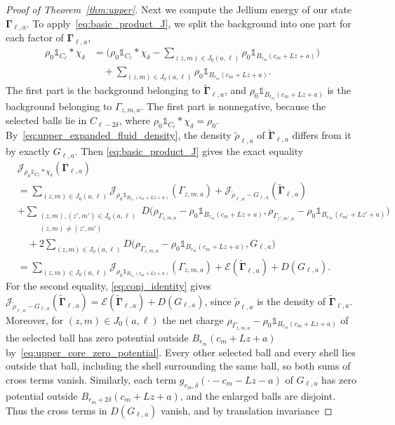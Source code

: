 \documentclass[final,reqno]{amsart}
\theoremstyle{remark}
\theoremstyle{definition}
\newcommand{\iden}{\mathbb{1}}
\newcommand{\EC}{\mathcal{E}}
\newcommand{\vGamma}{{\bm{\Gamma}}}
\begin{document}
\begin{proof}[Proof of Theorem~\ref{thm:upper}]
Next we compute the Jellium energy of our state $\vGamma_{\ell,a}$. To apply~\eqref{eq:basic_product_J}, we split the background into one part for each factor of $\vGamma_{\ell,a}$,
\begin{align*}
\rho_0\iden_{C_\ell}*\chi_\delta
&=\Big(\rho_0\iden_{C_\ell}*\chi_\delta-\sum_{(z,m)\in J_0(a,\ell)}\rho_0\iden_{B_{r_m}(c_m+Lz+a)}\Big)\\
&\quad+\sum_{(z,m)\in J_0(a,\ell)}\rho_0\iden_{B_{r_m}(c_m+Lz+a)}.
\end{align*}
The first part is the background belonging to $\tilde\vGamma_{\ell,a}$, and $\rho_0\iden_{B_{r_m}(c_m+Lz+a)}$ is the background belonging to $\Gamma_{z,m,a}$. The first part is nonnegative, because the selected balls lie in $C_{\ell-2\delta}$, where $\rho_0\iden_{C_\ell}*\chi_\delta=\rho_0$. By~\eqref{eq:upper_expanded_fluid_density}, the density $\tilde\rho_{\ell,a}$ of $\tilde\vGamma_{\ell,a}$ differs from it by exactly $G_{\ell,a}$. Then \eqref{eq:basic_product_J} gives the exact equality
\begin{align*}
&\mathcal J_{\rho_0\iden_{C_\ell}*\chi_\delta}(\vGamma_{\ell,a})\\
&=\sum_{(z,m)\in J_0(a,\ell)}
\mathcal J_{\rho_0\iden_{B_{r_m}(c_m+Lz+a)}}(\Gamma_{z,m,a})
+\mathcal J_{\tilde\rho_{\ell,a}-G_{\ell,a}}(\tilde\vGamma_{\ell,a})\\
&+\sum_{\substack{(z,m),(z',m')\in J_0(a,\ell)\\(z,m)\ne(z',m')}}
D\big(\rho_{\Gamma_{z,m,a}}-\rho_0\iden_{B_{r_m}(c_m+Lz+a)},\rho_{\Gamma_{z',m',a}}-\rho_0\iden_{B_{r_{m'}}(c_{m'}+Lz'+a)}\big)\\
&\quad+2\sum_{(z,m)\in J_0(a,\ell)}D\big(\rho_{\Gamma_{z,m,a}}-\rho_0\iden_{B_{r_m}(c_m+Lz+a)},G_{\ell,a}\big)\\
&=\sum_{(z,m)\in J_0(a,\ell)}
\mathcal J_{\rho_0\iden_{B_{r_m}(c_m+Lz+a)}}(\Gamma_{z,m,a})
+\EC(\tilde\vGamma_{\ell,a})+D(G_{\ell,a}).
\end{align*}
For the second equality, \eqref{eq:conj_identity} gives $\mathcal J_{\tilde\rho_{\ell,a}-G_{\ell,a}}(\tilde\vGamma_{\ell,a})=\EC(\tilde\vGamma_{\ell,a})+D(G_{\ell,a})$, since $\tilde\rho_{\ell,a}$ is the density of $\tilde\vGamma_{\ell,a}$. Moreover, for $(z,m)\in J_0(a,\ell)$ the net charge $\rho_{\Gamma_{z,m,a}}-\rho_0\iden_{B_{r_m}(c_m+Lz+a)}$ of the selected ball has zero potential outside $B_{r_m}(c_m+Lz+a)$ by~\eqref{eq:upper_core_zero_potential}. Every other selected ball and every shell lies outside that ball, including the shell surrounding the same ball, so both sums of cross terms vanish. Similarly, each term $g_{r_m,\delta}(\cdot-c_m-Lz-a)$ of $G_{\ell,a}$ has zero potential outside $B_{r_m+2\delta}(c_m+Lz+a)$, and the enlarged balls are disjoint. Thus the cross terms in $D(G_{\ell,a})$ vanish, and by translation invariance

\end{proof}
\end{document}
